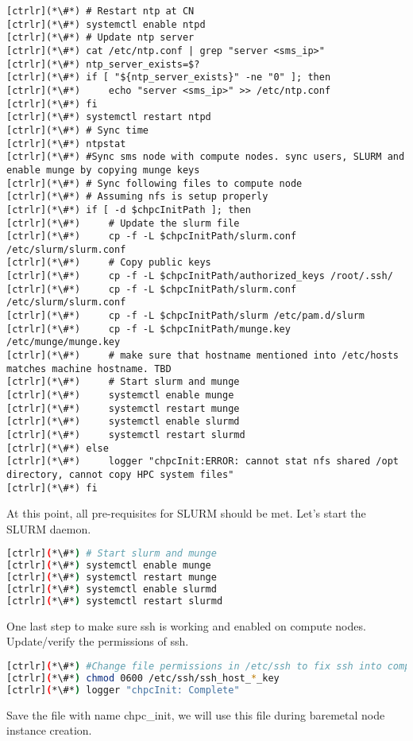 \begin{lstlisting}
[ctrlr](*\#*) # Restart ntp at CN
[ctrlr](*\#*) systemctl enable ntpd
[ctrlr](*\#*) # Update ntp server
[ctrlr](*\#*) cat /etc/ntp.conf | grep "server <sms_ip>"
[ctrlr](*\#*) ntp_server_exists=$?
[ctrlr](*\#*) if [ "${ntp_server_exists}" -ne "0" ]; then
[ctrlr](*\#*)     echo "server <sms_ip>" >> /etc/ntp.conf
[ctrlr](*\#*) fi
[ctrlr](*\#*) systemctl restart ntpd
[ctrlr](*\#*) # Sync time
[ctrlr](*\#*) ntpstat
[ctrlr](*\#*) #Sync sms node with compute nodes. sync users, SLURM and enable munge by copying munge keys
[ctrlr](*\#*) # Sync following files to compute node
[ctrlr](*\#*) # Assuming nfs is setup properly
[ctrlr](*\#*) if [ -d $chpcInitPath ]; then
[ctrlr](*\#*)     # Update the slurm file
[ctrlr](*\#*)     cp -f -L $chpcInitPath/slurm.conf /etc/slurm/slurm.conf
[ctrlr](*\#*)     # Copy public keys
[ctrlr](*\#*)     cp -f -L $chpcInitPath/authorized_keys /root/.ssh/
[ctrlr](*\#*)     cp -f -L $chpcInitPath/slurm.conf /etc/slurm/slurm.conf
[ctrlr](*\#*)     cp -f -L $chpcInitPath/slurm /etc/pam.d/slurm
[ctrlr](*\#*)     cp -f -L $chpcInitPath/munge.key /etc/munge/munge.key
[ctrlr](*\#*)     # make sure that hostname mentioned into /etc/hosts matches machine hostname. TBD
[ctrlr](*\#*)     # Start slurm and munge 
[ctrlr](*\#*)     systemctl enable munge
[ctrlr](*\#*)     systemctl restart munge
[ctrlr](*\#*)     systemctl enable slurmd
[ctrlr](*\#*)     systemctl restart slurmd
[ctrlr](*\#*) else
[ctrlr](*\#*)     logger "chpcInit:ERROR: cannot stat nfs shared /opt directory, cannot copy HPC system files"
[ctrlr](*\#*) fi
\end{lstlisting}

	At this point, all pre-requisites for SLURM should be met. Let's start the SLURM daemon.


\begin{lstlisting}[language=bash,keywords={}]
[ctrlr](*\#*) # Start slurm and munge 
[ctrlr](*\#*) systemctl enable munge
[ctrlr](*\#*) systemctl restart munge
[ctrlr](*\#*) systemctl enable slurmd
[ctrlr](*\#*) systemctl restart slurmd
\end{lstlisting}

	One last step to make sure ssh is working and enabled on compute nodes. Update/verify the permissions of ssh.


\begin{lstlisting}[language=bash,keywords={}]
[ctrlr](*\#*) #Change file permissions in /etc/ssh to fix ssh into compute node
[ctrlr](*\#*) chmod 0600 /etc/ssh/ssh_host_*_key
[ctrlr](*\#*) logger "chpcInit: Complete"
\end{lstlisting}

	Save the file with name chpc\_init, we will use this file during baremetal node instance creation.

